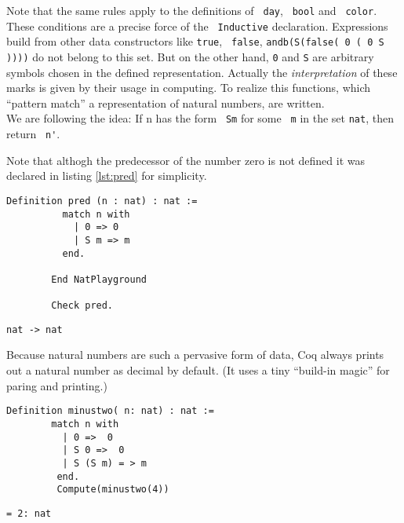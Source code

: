 	  Note that the same rules apply to the definitions of \lstinline! day!, \lstinline! bool! and \lstinline! color!.
	  These conditions are a precise force of the \lstinline! Inductive! declaration. 
	  Expressions build from other data constructors like \lstinline!true!, \lstinline! false!, \lstinline!andb(S(false( 0 ( 0 S ))))! do not belong to this set.  
	  But on the other hand, \lstinline!0! and \lstinline!S! are arbitrary symbols chosen in the defined representation. 
	  Actually the {\itshape interpretation} of these marks is given by their usage in computing.
	  To realize this functions, which ``pattern match'' a representation of natural numbers, are written.\\  
	  We are following the idea:  If n has the form \lstinline! Sm! for some \lstinline! m! in the set \lstinline!nat!, then return  \lstinline! n'!.
	  \begin{example}%
	   {\normalfont 
	   
	   Note that althogh the predecessor of the number zero is not defined it was declared in listing \ref{lst:pred} for simplicity.    
	   
	   \begin{minipage}[t]{0.45\textwidth}
	   \begin{lstlisting}[caption= \lstinline!pred!, label =lst:pred]
	  	Definition pred (n : nat) : nat := 
	  	  match n with 
	   	    | 0 => 0
	   	    | S m => m
	   	  end. 
	   	  
	    End NatPlayground
	   	 
	    Check pred. 
	    \end{lstlisting}
	    \end{minipage}
	    \hfill
	    \begin{minipage}[t]{0.45\textwidth}
	    \begin{lstlisting}[caption= Coq-output]
	     nat -> nat    
	    \end{lstlisting}
	    \end{minipage}
	   
	    
	  \normalfont }
	  \end{example}
	  
	  Because natural numbers are such a pervasive form of data, Coq always prints out a natural number as decimal by default.
	  (It uses a tiny ``build-in magic'' for paring and printing.)
	 
	  \begin{minipage}[t]{0.50\textwidth}
	  \begin{lstlisting}[caption= \lstinline! minustwo!]
	   Definition minustwo( n: nat) : nat :=
	    match n with
	      | 0 =>  0
	      | S 0 =>  0
	      | S (S m) = > m
	     end.
	     Compute(minustwo(4))
	   \end{lstlisting} 
	   \end{minipage} 
	   \hfill     
	  \begin{minipage}[t]{0.45\textwidth}
	  \begin{lstlisting}[caption = Coq-output] 
	    = 2: nat 
	   \end{lstlisting}
	   \end{minipage}     
	      
